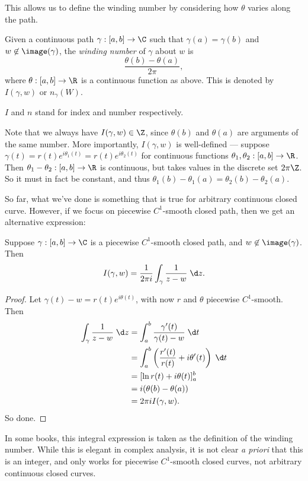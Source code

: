\documentclass[a4paper]{article}
\begin{document}
This allows us to define the winding number by considering how $\theta$ varies along the path.

\begin{defi}
  Given a continuous path $\gamma: [a, b] \to \C$ such that $\gamma(a) = \gamma(b)$ and $w \not\in \image(\gamma)$, the \emph{winding number} of $\gamma$ about $w$ is
  \[
    \frac{\theta(b) - \theta(a)}{2\pi},
  \]
  where $\theta: [a, b] \to \R$ is a continuous function as above. This is denoted by $I(\gamma, w)$ or $n_\gamma(W)$.
\end{defi}
$I$ and $n$ stand for index and number respectively.

Note that we always have $I(\gamma, w) \in \Z$, since $\theta(b)$ and $\theta(a)$ are arguments of the same number. More importantly, $I(\gamma, w)$ is well-defined --- suppose $\gamma(t) = r(t) e^{i \theta_1(t)} = r(t) e^{i\theta_2(t)}$ for continuous functions $\theta_1, \theta_2: [a, b] \to \R$. Then $\theta_1 - \theta_2 : [a, b] \to \R$ is continuous, but takes values in the discrete set $2\pi \Z$. So it must in fact be constant, and thus $\theta_1(b) - \theta_1(a) = \theta_2(b) - \theta_2(a)$.

So far, what we've done is something that is true for arbitrary continuous closed curve. However, if we focus on piecewise $C^1$-smooth closed path, then we get an alternative expression:
\begin{lemma}
  Suppose $\gamma: [a, b] \to \C$ is a piecewise $C^1$-smooth closed path, and $w \not\in \image(\gamma)$. Then
  \[
    I(\gamma, w) = \frac{1}{2\pi i} \int_\gamma \frac{1}{z - w} \;\d z.
  \]
\end{lemma}

\begin{proof}
  Let $\gamma(t) - w = r(t) e^{i \theta(t)}$, with now $r$ and $\theta$ piecewise $C^1$-smooth. Then
  \begin{align*}
    \int_\gamma \frac{1}{z - w}\;\d z &= \int_a^b \frac{\gamma'(t)}{\gamma(t) - w}\;\d t\\
    &= \int_a^b \left(\frac{r'(t)}{r(t)} + i \theta'(t)\right) \;\d t\\
    &= [\ln r(t) + i\theta(t)]^b_a\\
    &= i(\theta(b) - \theta(a))\\
    &= 2\pi i I(\gamma, w).
  \end{align*}
  So done.
\end{proof}

In some books, this integral expression is taken as the definition of the winding number. While this is elegant in complex analysis, it is not clear \emph{a priori} that this is an integer, and only works for piecewise $C^1$-smooth closed curves, not arbitrary continuous closed curves.
\end{document}
